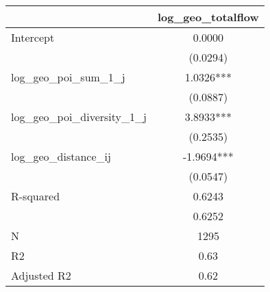 \begin{table}
\caption{}
\begin{center}
\begin{tabular}{lc}
\hline
                               & log\_geo\_totalflow  \\
\midrule
Intercept                      & 0.0000               \\
                               & (0.0294)             \\
log\_geo\_poi\_sum\_1\_j       & 1.0326***            \\
                               & (0.0887)             \\
log\_geo\_poi\_diversity\_1\_j & 3.8933***            \\
                               & (0.2535)             \\
log\_geo\_distance\_ij         & -1.9694***           \\
                               & (0.0547)             \\
R-squared                      & 0.6243               \\
                               & 0.6252               \\
N                              & 1295                 \\
R2                             & 0.63                 \\
Adjusted R2                    & 0.62                 \\
\hline
\end{tabular}
\end{center}
\end{table}